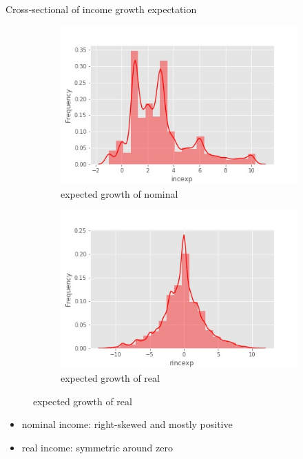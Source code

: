 \documentclass{beamer}
\begin{document}
\begin{frame}{Cross-sectional of income growth expectation}
	\begin{figure}
	\centering
	\label{incexp_hist}
	\begin{subfigure}[b]{0.45\textwidth}
		\centering
		\caption{expected growth of nominal}
		\includegraphics[width=\textwidth]{figures/hist_incexp}
	\end{subfigure}
	\begin{subfigure}[b]{0.45\textwidth}
		\centering
		\caption{expected growth of real}
		\includegraphics[width=\textwidth]{figures/hist_rincexp}
	\end{subfigure}
\end{figure}
	\begin{itemize}
		\item nominal income: right-skewed and mostly positive   
		\item real income: symmetric around zero  
	\end{itemize}
\end{frame}
\end{document}
